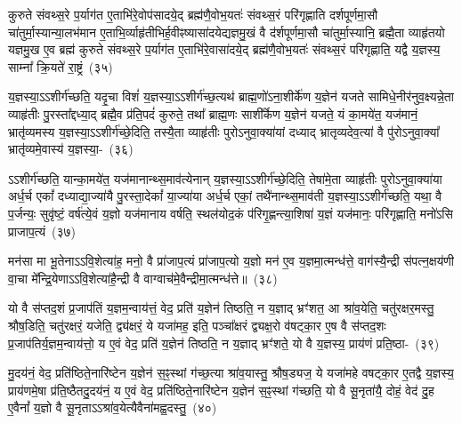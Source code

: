 कुरुते संवथ्स॒रे प॒र्याग॑त ए॒ताभि॑रे॒वोप॑सादये॒द् ब्रह्म॑णै॒वोभ॒यतः॑ संवथ्स॒रं परि॑गृह्णाति दर्\mbox{}श\-पूर्ण\-मा॒सौ चा॑तुर्मा॒स्यान्या॒लभ॑मान ए॒ताभि॒र्व्याहृ॑तीभिर्\mbox{}ह॒वीꣴष्यासा॑द\-येद्यज्ञमु॒खं वै द॑र्\mbox{}शपूर्णमा॒सौ चा॑तुर्मा॒स्यानि॒ ब्रह्मै॒ता व्याहृ॑तयो यज्ञमु॒ख ए॒व ब्रह्म॑ कुरुते संवथ्स॒रे प॒र्याग॑त ए॒ताभि॑रे॒वासा॑द\-ये॒द् ब्रह्म॑णै॒वोभ॒यतः॑ संवथ्स॒रं परि॑गृह्णाति॒ यद्वै य॒ज्ञस्य॒ साम्ना᳚ क्रि॒यते॑ रा॒ष्ट्रं~(३५)\ip

य॒ज्ञस्या॒\-ऽऽ\-शीर्ग॑च्छति॒ यदृ॒चा विशं॑ य॒ज्ञस्या॒\-ऽऽ\-शीर्ग॑च्छ॒त्यथ॑ ब्राह्म॒णो॑\-ऽना॒शीर्के॑ण य॒ज्ञेन॑ यजते सामिधे॒नीर॑नुव॒क्ष्यन्ने॒ता व्याहृ॑तीः पु॒रस्ता᳚द्दध्या॒द् ब्रह्मै॒व प्र॑ति॒पदं॑ कुरुते॒ तथा᳚ ब्राह्म॒णः साशी᳚र्केण य॒ज्ञेन॑ यजते॒ यं का॒मये॑त॒ यज॑मानं॒ भ्रातृ॑व्यमस्य य॒ज्ञस्या॒\-ऽऽ\-शीर्ग॑च्छे॒दिति॒ तस्यै॒ता व्याहृ॑तीः पुरो\-ऽनुवा॒क्या॑यां दध्याद् भ्रातृव्यदेव॒त्या॑ वै पु॑रो\-ऽनुवा॒क्या᳚ भ्रातृ॑व्यमे॒वास्य॑ य॒ज्ञस्या॒-~(३६)\ip

ऽऽशीर्ग॑च्छति॒ यान्का॒मये॑त॒ यज॑मानान्थ्स॒माव॑त्येनान् य॒ज्ञस्या॒\-ऽऽ\-शीर्ग॑च्छे॒दिति॒ तेषा॑मे॒ता व्याहृ॑तीः पुरो\-ऽनुवा॒क्या॑या अर्ध॒र्च एकां᳚ दध्याद्या॒ज्या॑यै पु॒रस्ता॒देकां᳚ या॒ज्या॑या अर्ध॒र्च एकां॒ तथै॑नान्थ्स॒माव॑ती य॒ज्ञस्या॒\-ऽऽ\-शीर्ग॑च्छति॒ यथा॒ वै प॒र्जन्यः॒ सुवृ॑ष्टं॒ वर्\mbox{}ष॑त्ये॒वं य॒ज्ञो यज॑मानाय वर्\mbox{}षति॒ स्थल॑योद॒कं प॑रिगृ॒ह्णन्त्या॒शिषा॑ य॒ज्ञं यज॑मानः॒ परि॑गृह्णाति॒ मनो॑\-ऽसि प्राजाप॒त्यं~(३७)\ip

मन॑सा मा भू॒तेना\-ऽऽ\-वि॒शेत्या॑ह॒ मनो॒ वै प्रा॑जाप॒त्यं प्रा॑जाप॒त्यो य॒ज्ञो मन॑ ए॒व य॒ज्ञमा॒त्मन्ध॑त्ते॒ वाग॑स्यै॒न्द्री स॑पत्न॒क्षय॑णी वा॒चा मे᳚न्द्रि॒येणा\-ऽऽ\-वि॒शेत्या॑है॒न्द्री वै वाग्वाच॑मे॒वैन्द्रीमा॒त्मन्ध॑त्ते॥~(३८)\ip

{\anuvakamend[{तेनै॒व ब्रह्म॑ रा॒ष्ट्रमे॒वास्य॑ य॒ज्ञस्य॑ प्राजाप॒त्यꣳ षट्त्रिꣳ॑शच्च}]}%

यो वै स॑प्तद॒शं प्र॒जा\-प॑तिं य॒ज्ञम॒न्वाय॑त्तं॒ वेद॒ प्रति॑ य॒ज्ञेन॑ तिष्ठति॒ न य॒ज्ञाद् भ्रꣳ॑शत॒ आ श्रा॑व॒येति॒ चतु॑रक्षर॒मस्तु॒ श्रौष॒डिति॒ चतु॑रक्षरं॒ यजेति॒ द्व्य॑क्षरं॒ ये यजा॑मह॒ इति॒ पञ्चा᳚क्षरं द्व्यक्ष॒रो व॑षट्का॒र ए॒ष वै स॑प्तद॒शः प्र॒जा\-प॑तिर्य॒ज्ञम॒न्वाय॑त्तो॒ य ए॒वं वेद॒ प्रति॑ य॒ज्ञेन॑ तिष्ठति॒ न य॒ज्ञाद् भ्रꣳ॑शते॒ यो वै य॒ज्ञस्य॒ प्राय॑णं प्रति॒ष्ठा-~(३९)\ip

मु॒दय॑नं॒ वेद॒ प्रति॑ष्ठिते॒नारि॑ष्टेन य॒ज्ञेन॑ स॒ꣴ॒स्थां ग॑च्छ॒त्या श्रा॑व॒यास्तु॒ श्रौष॒ड्यज॒ ये यजा॑महे वषट्का॒र ए॒तद्वै य॒ज्ञस्य॒ प्राय॑णमे॒षा प्र॑ति॒ष्ठैतदु॒दय॑नं॒ य ए॒वं वेद॒ प्रति॑ष्ठिते॒नारि॑ष्टेन य॒ज्ञेन॑ स॒ꣴ॒स्थां ग॑च्छति॒ यो वै सू॒नृता॑यै॒ दोहं॒ वेद॑ दु॒ह ए॒वैनां᳚ य॒ज्ञो वै सू॒नृता\-ऽऽ\-श्रा॑व॒येत्यैवैना॑मह्व॒दस्तु॒~(४०)\ip

